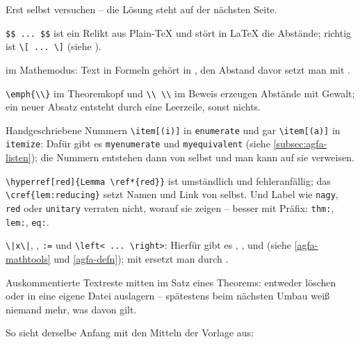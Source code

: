 %
Erst selbst versuchen -- die Lösung steht auf der nächsten Seite.
%
\clearpage
{}
%
\begin{myenumerate}
\item
\verb|$$ ... $$| ist ein Relikt aus Plain-\TeX{} und stört in \LaTeX{} die Abstände; richtig ist \verb|\[ ... \]| (siehe \textcite{l2tabu}).
\item
{} im Mathemodus: Text in Formeln gehört in , den Abstand davor setzt man mit .
\item
\verb|\emph{\\}| im Theoremkopf und \verb|\\ \\| im Beweis erzeugen Abstände mit Gewalt; ein neuer Absatz entsteht durch eine Leerzeile, sonst nichts.
\item
Handgeschriebene Nummern \verb|\item[(i)]| in \texttt{enumerate} und gar \verb|\item[(a)]| in \texttt{itemize}: Dafür gibt es \texttt{myenumerate} und \texttt{myequivalent} (siehe \vref{subsec:agfa-listen}); die Nummern entstehen dann von selbst und man kann auf sie verweisen.
\item
\verb|\hyperref[red]{Lemma \ref*{red}}| ist umständlich und fehleranfällig; das \verb|\cref{lem:reducing}| setzt Namen und Link von selbst. 
Und Label wie \texttt{nagy}, \texttt{red} oder \texttt{unitary} verraten nicht, worauf sie zeigen -- besser mit Präfix: \texttt{thm:}, \texttt{lem:}, \texttt{eq:}.
\item
\verb+\|x\|+, , \verb|:=| und \verb|\left< ... \right>|: Hierfür gibt es , ,  und  (siehe \vref{agfa-mathtools} und \vref{agfa-defn});  mit  ersetzt man durch .
\item
Auskommentierte Textreste mitten im Satz eines Theorems: entweder löschen oder in eine eigene Datei auslagern -- spätestens beim nächsten Umbau weiß niemand mehr, was davon gilt.
\end{myenumerate}
%
So sieht derselbe Anfang mit den Mitteln der Vorlage aus:
%
